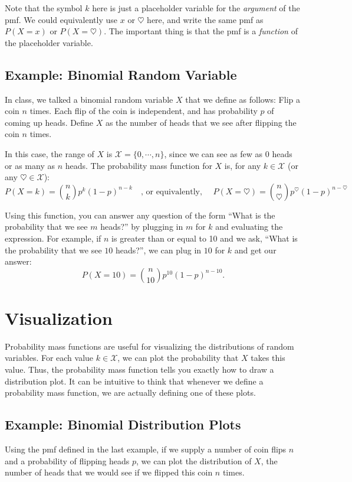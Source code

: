 \documentclass[11pt]{article}
\begin{document}
Note that the symbol $k$ here is just a placeholder variable for the \emph{argument} of the pmf. We could equivalently use $x$ or $\heartsuit$ here, and write the same pmf as $P(X = x)$ or $P(X = \heartsuit)$. The important thing is that the pmf is a \emph{function} of the placeholder variable.

\subsection*{Example: Binomial Random Variable}

In class, we talked a binomial random variable $X$ that we define as follows: Flip a coin $n$ times. Each flip of the coin is independent, and has probability $p$ of coming up heads. Define $X$ as the number of heads that we see after flipping the coin $n$ times.

In this case, the range of $X$ is $\mathcal X = \{0, \cdots, n\}$, since we can see as few as $0$ heads or as many as $n$ heads. The probability mass function for $X$ is, for any $k \in \mathcal X$ (or any $\heartsuit \in \mathcal X$):
$$
P(X = k) = {n \choose k} p^k (1-p)^{n-k}\hspace{1em}\textrm{, or equivalently, } \hspace{1em}P(X = \heartsuit) = {n \choose \heartsuit} p^{\heartsuit} (1-p)^{n-\heartsuit}
$$

Using this function, you can answer any question of the form ``What is the probability that we see $m$ heads?'' by plugging in $m$ for $k$ and evaluating the expression. For example, if $n$ is greater than or equal to 10 and we ask, ``What is the probability that we see $10$ heads?'', we can plug in $10$ for $k$ and get our answer:
$$
P(X = 10) = {n \choose 10} p^{10} (1-p)^{n-10}.
$$

\section*{Visualization}
Probability mass functions are useful for visualizing the distributions of random variables. For each value $k \in \mathcal X$, we can plot the probability that $X$ takes this value. Thus, the probability mass function tells you exactly how to draw a distribution plot. It can be intuitive to think that whenever we define a probability mass function, we are actually defining one of these plots.

\subsection*{Example: Binomial Distribution Plots}
Using the pmf defined in the last example, if we supply a number of coin flips $n$ and a probability of flipping heads $p$, we can plot the distribution of $X$, the number of heads that we would see if we flipped this coin $n$ times.
\end{document}
